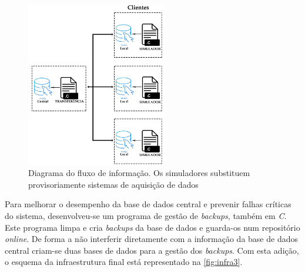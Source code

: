\documentclass[11pt,twoside,a4paper]{report}
\begin{document}
\begin{figure}[H]
	\begin{center}
		\includegraphics[width=0.55\textwidth]{Esquema_Projeto_5} %
		\caption[Diagrama do fluxo de informação]{Diagrama do fluxo de informação. Os simuladores substituem provisoriamente sistemas de aquisição de dados}
		\label{fig:infra2}
		\end{center}
\end{figure}
Para melhorar o desempenho da base de dados central e prevenir falhas críticas do sistema, desenvolveu-se um programa de gestão de \textit{backups}, também em \textit{C}. Este programa limpa e cria \textit{backups} da base de dados e guarda-os num repositório \textit{online}. De forma a não interferir diretamente com a informação da base de dados central criam-se duas bases de dados para a gestão dos \textit{backups}. Com esta adição, o esquema da infraestrutura final está representado na \autoref{fig:infra3}.\par 
\end{document}
